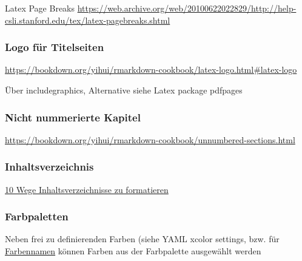 \documentclass[
  a4paper,
  twoside]{article}
\begin{document}
Latex Page Breaks \url{https://web.archive.org/web/20100622022829/http://help-csli.stanford.edu/tex/latex-pagebreaks.shtml}

\hypertarget{logo-fuxfcr-titelseiten}{%
\subsubsection{Logo für Titelseiten}\label{logo-fuxfcr-titelseiten}}

\url{https://bookdown.org/yihui/rmarkdown-cookbook/latex-logo.html\#latex-logo}

Über includegraphics, Alternative siehe Latex package pdfpages

\hypertarget{nicht-nummerierte-kapitel}{%
\subsubsection{Nicht nummerierte Kapitel}\label{nicht-nummerierte-kapitel}}

\url{https://bookdown.org/yihui/rmarkdown-cookbook/unnumbered-sections.html}

\hypertarget{inhaltsverzeichnis}{%
\subsubsection{Inhaltsverzeichnis}\label{inhaltsverzeichnis}}

\href{https://texblog.org/2011/09/09/10-ways-to-customize-tocloflot/}{10 Wege Inhaltsverzeichnisse zu formatieren}

\hypertarget{farbpaletten}{%
\subsubsection{Farbpaletten}\label{farbpaletten}}

Neben frei zu definierenden Farben (siehe YAML xcolor settings, bzw. für \href{https://www.latextemplates.com/svgnames-colors}{Farbennamen} können Farben aus der Farbpalette ausgewählt werden
\end{document}
